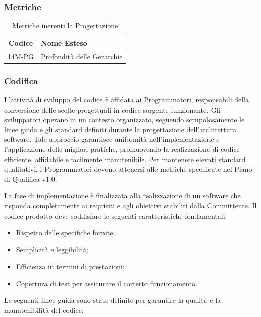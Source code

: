 \subsubsection{Metriche}
\begin{table}[h!]
    \centering
    \caption{Metriche inerenti la Progettazione}
    \label{tab:metriche_progettazione}
    \begin{tabular}{|c|l|}
        \hline
        \textbf{Codice} & \textbf{Nome Esteso} \\ 
        \hline
        14M-PG         & Profondità delle Gerarchie \\ 
        \hline
    \end{tabular}
\end{table}






\subsubsection{Codifica}
L'attività di sviluppo del codice è affidata ai Programmatori, responsabili della conversione delle scelte progettuali in codice sorgente funzionante. Gli sviluppatori operano in un contesto organizzato, seguendo scrupolosamente le linee guida e gli standard definiti durante la progettazione dell'architettura software. Tale approccio garantisce uniformità nell'implementazione e l'applicazione delle migliori pratiche, promuovendo la realizzazione di codice efficiente, affidabile e facilmente manutenibile. 
Per mantenere elevati standard qualitativi, i Programmatori devono attenersi alle metriche specificate nel Piano di Qualifica v1.0.

La fase di implementazione è finalizzata alla realizzazione di un software che risponda completamente ai requisiti e agli obiettivi stabiliti dalla Committente. Il codice prodotto deve soddisfare le seguenti caratteristiche fondamentali:
\begin{itemize}
    \item Rispetto delle specifiche fornite;
    \item Semplicità e leggibilità;
    \item Efficienza in termini di prestazioni;
    \item Copertura di test per assicurare il corretto funzionamento.
\end{itemize}

Le seguenti linee guida sono state definite per garantire la qualità e la manutenibilità del codice:


